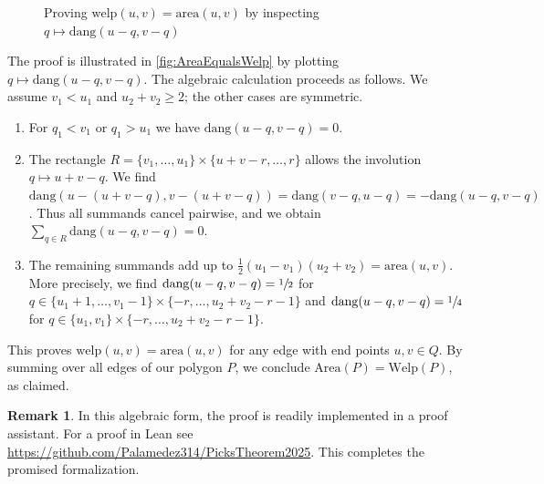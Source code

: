 \documentclass[a4paper]{amsart}
\numberwithin{equation}{section}
\theoremstyle{plain}
\theoremstyle{definition}
\newtheorem{remark}[theorem]{Remark}
\newcommand{\area}{\mathrm{area}}
\newcommand{\Area}{\mathrm{Area}}
\newcommand{\dang}{\mathrm{dang}}
\newcommand{\welp}{\mathrm{welp}}
\newcommand{\Welp}{\mathrm{Welp}}
\begin{document}
\begin{figure}[ht]
  \caption{Proving $\welp(u,v) = \area(u,v)$ by inspecting $q \mapsto \dang(u-q,v-q)$}
  \label{fig:AreaEqualsWelp}
\end{figure}


The proof is illustrated in \autoref{fig:AreaEqualsWelp}
by plotting $q \mapsto \dang(u-q,v-q)$.
The algebraic calculation proceeds as follows.
We assume $v_1 < u_1$ and $u_2 + v_2 \ge 2$;
the other cases are symmetric.
\begin{enumerate}
\item
  For $q_1 < v_1$ or $q_1 > u_1$ we have $\dang(u-q,v-q) = 0$.
\item
  The rectangle $R = \{v_1,\ldots,u_1\} \times \{u+v-r,\ldots,r\}$
  allows the involution $q \mapsto u+v-q$.
  We find $\dang(u-(u+v-q), v-(u+v-q)) = \dang(v-q,u-q) = -\dang(u-q,v-q)$.
  Thus all summands cancel pairwise,
  and we obtain $\sum_{q \in R} \dang(u-q,v-q) = 0$.
\item
  The remaining summands add up to $\frac{1}{2} (u_1-v_1) (u_2+v_2) = \area(u,v)$.
  More precisely, we find $\dang(u-q,v-q) = \sfrac{1}{2}$
  for $q \in \{u_1+1,\ldots,v_1-1\} \times \{-r,\ldots,u_2+v_2-r-1\}$
  and $\dang(u-q,v-q) = \sfrac{1}{4}$
  for $q \in \{u_1,v_1\} \times \{-r,\ldots,u_2+v_2-r-1\}$.
\end{enumerate}

This proves $\welp(u,v) = \area(u,v)$
for any edge with end points $u,v \in Q$.
By summing over all edges of our polygon $P$,
we conclude $\Area(P) = \Welp(P)$, as claimed. %


\begin{remark}
  In this algebraic form, the proof is readily implemented in a proof assistant.
  For a proof in Lean see \url{https://github.com/Palamedez314/PicksTheorem2025}.
  This completes the promised formalization.
\end{remark}


\appendix
\end{document}
